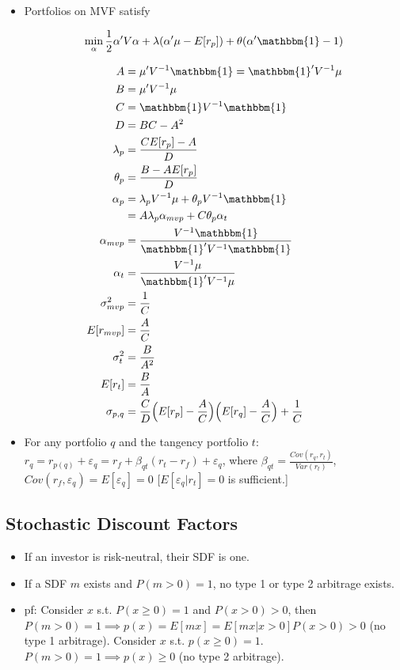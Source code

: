 \documentclass{article}
\newcommand{\ones}{\mathbbm{1}}
\begin{document}
\begin{itemize}

\item Portfolios on MVF satisfy

$$
\min_\alpha \frac{1}{2} \alpha' V \alpha + \lambda(\alpha' \mu - E[r_p]) + \theta (\alpha'\ones - 1)
$$

\begin{align*}
A &= \mu' V^{-1} \ones = \ones' V^{-1} \mu \\
B &= \mu' V^{-1} \mu \\
C &= \ones  V^{-1} \ones \\
D &= BC - A^2\\
\lambda_p &= \frac{CE[r_p] - A}{D}\\
\theta_p &= \frac{B - AE[r_p]}{D}\\
\alpha_p 
&= \lambda_p V^{-1} \mu + \theta_p V^{-1} \ones \\
&= A \lambda_p \alpha_{mvp} + C \theta_p \alpha_t\\
\alpha_{mvp} &= \frac{V^{-1}\ones}{\ones'V^{-1}\ones}\\
\alpha_{t} &= \frac{V^{-1}\mu}{\ones'V^{-1}\mu}\\
\sigma_{mvp}^2 &= \frac{1}{C} \\
E[r_{mvp}] &= \frac{A}{C}\\
\sigma_{t}^2 &= \frac{B}{A^2} \\
E[r_{t}] &= \frac{B}{A} \\
\sigma_{p,q} &= \frac{C}{D}\Big(E[r_p] - \frac{A}{C}\Big)\Big(E[r_q] - \frac{A}{C}\Big)+\frac{1}{C}
\end{align*}

\item For any portfolio $q$ and the tangency portfolio $t$: $r_q = r_{p(q)} + \varepsilon_q = r_f + \beta_{qt}(r_t - r_f) + \varepsilon_q$, where $\beta_{qt} = \frac{Cov(r_q, r_t)}{Var(r_t)}$, $Cov(r_f, \varepsilon_q) = E[\varepsilon_q] =0$ [$E[\varepsilon_q | r_t] = 0$ is sufficient.]

\end{itemize}

\subsection*{Stochastic Discount Factors}

\begin{itemize}

\item If an investor is risk-neutral, their SDF is one.

\item If a SDF $m$ exists and $P(m > 0) = 1$, no type 1 or type 2 arbitrage exists.

\item pf: Consider $x$ s.t. $P(x \ge 0 ) =1$ and $P(x > 0) > 0$, then $P(m > 0) =1 \implies p(x) = E[mx] = E[mx|x>0]P(x>0) >0$ (no type 1 arbitrage).  Consider $x$ s.t. $p(x \ge 0) = 1$. $P(m>0) = 1 \implies p(x) \ge 0$ (no type 2 arbitrage).  

\end{itemize}
\end{document}
